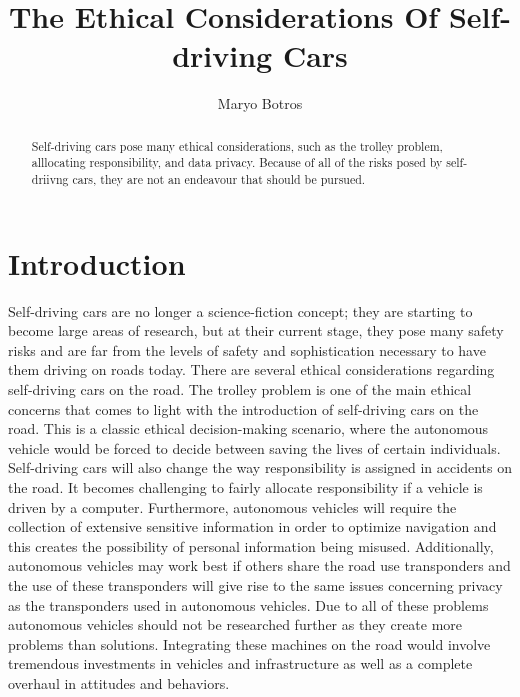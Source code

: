 \documentclass[10pt,twocolumn]{article}
\title{The Ethical Considerations Of Self-driving Cars}
\author{Maryo Botros}
\affiliation{Occidental College}
\begin{document}
\maketitle

\begin{abstract}
    Self-driving cars pose many ethical considerations, such as the trolley problem, alllocating responsibility, and data privacy. Because of all of the risks posed by self-driivng cars, they are not an endeavour that should be pursued. 
    
\end{abstract}

\section{Introduction}
Self-driving cars are no longer a science-fiction concept; they are starting to become large areas of research, but at their current stage, they pose many safety risks and are far from the levels of safety and sophistication necessary to have them driving on roads today. There are several ethical considerations regarding self-driving cars on the road. The trolley problem is one of the main ethical concerns that comes to light with the introduction of self-driving cars on the road. This is a classic ethical decision-making scenario, where the autonomous vehicle would be forced to decide between saving the lives of certain individuals. Self-driving cars will also change the way responsibility is assigned in accidents on the road. It becomes challenging to fairly allocate responsibility if a vehicle is driven by a computer. Furthermore, autonomous vehicles will require the collection of extensive sensitive information in order to optimize navigation and this creates the possibility of personal information being misused. Additionally, autonomous vehicles may work best if others share the road use transponders and the use of these transponders will give rise to the same issues concerning privacy as the transponders used in autonomous vehicles. Due to all of these problems autonomous vehicles should not be researched further as they create more problems than solutions. Integrating these machines on the road would involve tremendous investments in vehicles and infrastructure as well as a complete overhaul  in attitudes and behaviors. 
\end{document}
